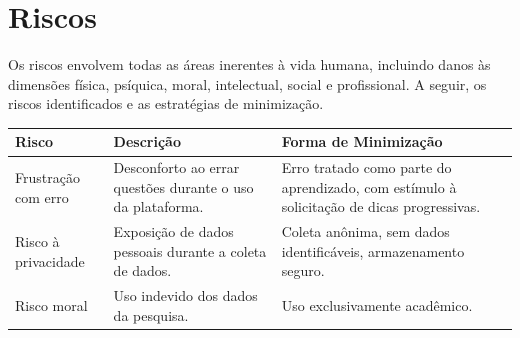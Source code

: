\chapter{Riscos}

Os riscos envolvem todas as áreas inerentes à vida humana, incluindo danos às dimensões física, psíquica, moral, intelectual, social e profissional. A seguir, os riscos identificados e as estratégias de minimização.

\begin{quadro}[htbp]
    \centering
    \caption{\label{qua:riscos}Riscos identificados e formas de minimização}
    \renewcommand{\arraystretch}{1.2}
    \begin{tabular}{|>{\raggedright\arraybackslash}p{3.0cm}|>{\raggedright\arraybackslash}p{4.2cm}|>{\raggedright\arraybackslash}p{6.6cm}|}
    \hline
    \textbf{Risco} & \textbf{Descrição} & \textbf{Forma de Minimização} \\ \hline
    Frustração com erro & Desconforto ao errar questões durante o uso da plataforma. & Erro tratado como parte do aprendizado, com estímulo à solicitação de dicas progressivas. \\ \hline
    Risco à privacidade & Exposição de dados pessoais durante a coleta de dados. & Coleta anônima, sem dados identificáveis, armazenamento seguro. \\ \hline
    Risco moral & Uso indevido dos dados da pesquisa. & Uso exclusivamente acadêmico. \\ \hline
    \end{tabular}
\end{quadro}

